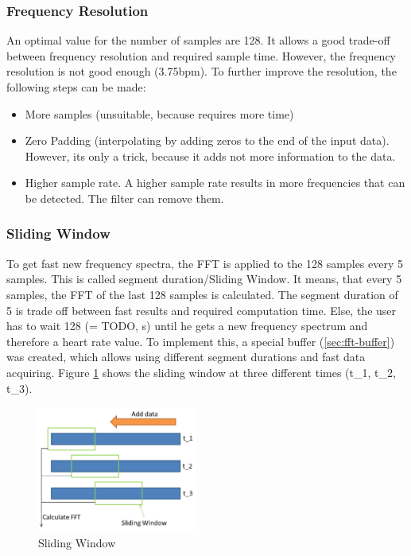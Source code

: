 \documentclass[notitlepage]{scrreprt}
\begin{document}
\subsubsection{Frequency Resolution}
An optimal value for the number of samples are 128. It allows a good trade-off between frequency resolution and required sample time.
However, the frequency resolution is not good enough (3.75bpm). To further improve the resolution, the following steps can be made:

\begin{itemize}
	\item{More samples (unsuitable, because requires more time)}
	\item{Zero Padding (interpolating by adding zeros to the end of the input data). However, its only a trick, because it adds not more information to the data.}
	\item{Higher sample rate. A higher sample rate results in more frequencies that can be detected. The filter can remove them.}
\end{itemize}

\subsubsection{Sliding Window}
\label{subsubsec:sliding-window}
To get fast new frequency spectra, the FFT is applied to the 128 samples every 5 samples. This is called segment duration/Sliding Window. It means, that every 5 samples, the FFT of the last 128 samples is calculated. The segment duration of 5 is trade off between fast results and required computation time. Else, the user has to wait 128 (= TODO, s) until he gets a new frequency spectrum and therefore a heart rate value. To implement this, a special buffer (\ref{sec:fft-buffer}) was created, which allows using different segment durations and fast data acquiring. Figure \ref{fig:sliding-window} shows the sliding window at three different times (t\_1, t\_2, t\_3).

\begin{figure}[H]
	\centering
	\includegraphics[width=200px]{images/slidingWindow.png}
	\caption{Sliding Window}
	\label{fig:sliding-window}
\end{figure}
\end{document}
